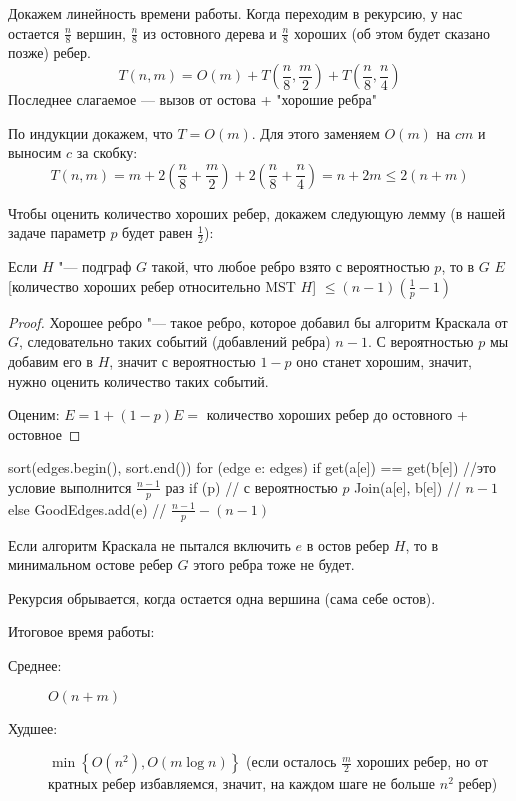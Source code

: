 Докажем линейность времени работы.
Когда переходим в рекурсию, у нас остается $\frac{n}{8}$ вершин, $\frac{n}{8}$ из остовного дерева
и $\frac{n}{8}$ хороших (об этом будет сказано позже) ребер.
\[ T(n, m) = O(m) + T\left(\frac{n}{8}, \frac{m}{2}\right) + T\left(\frac{n}{8}, \frac{n}{4}\right) \]
Последнее слагаемое — вызов от остова + "хорошие ребра"

По индукции докажем, что $T = O(m)$. Для этого заменяем $O(m)$ на $cm$ и выносим $c$ за скобку:
\[ T(n, m) = m + 2\left(\frac{n}{8} + \frac{m}{2}\right) + 2\left(\frac{n}{8} + \frac{n}{4}\right) = n + 2m \le 2(n + m) \]

Чтобы оценить количество хороших ребер, докажем следующую лемму (в нашей задаче параметр $p$ будет равен  $\frac{1}{2}$):

\begin{lemma}
	Если $H$ "--- подграф $G$ такой, что любое ребро взято с вероятностью $p$, то в $G$
	$E$[количество хороших ребер относительно 	{MST} $H$] $\le (n - 1)(\frac{1}{p} - 1)$
\end{lemma}
\begin{proof}
	Хорошее ребро "--- такое ребро, которое добавил бы алгоритм Краскала от $G$, следовательно таких событий (добавлений ребра) $n - 1$.
	С вероятностью $p$ мы добавим его в $H$, значит с вероятностью $1 - p$ оно станет хорошим, значит, нужно оценить количество таких событий.

Оценим: $E = 1 + (1 - p)E = $ количество хороших ребер до остовного + остовное
\end{proof}

\begin{cppcode}
sort(edges.begin(), sort.end())
for (edge e: edges) {
	if get(a[e]) == get(b[e]) //это условие выполнится $\frac{n - 1}{p}$ раз
		if (p) // с вероятностью $p$
			Join(a[e], b[e]) // $n - 1$
		else
			GoodEdges.add(e) // $\frac{n - 1}{p} - (n - 1)$
}
\end{cppcode}

\begin{Rem}
	Если алгоритм Краскала не пытался включить $e$ в остов ребер $H$, то в минимальном остове ребер $G$ этого ребра тоже не будет.
\end{Rem}
\begin{Rem}
	Рекурсия обрывается, когда остается одна вершина (сама себе остов).
\end{Rem}

Итоговое время работы:
\begin{description}
\item[Среднее:]
	$O(n + m)$

\item[Худшее:]
	$\min\left\{O\left(n^2\right), O(m \log n)\right\}$
	(если осталось $\frac{m}{2}$ хороших ребер, но от кратных ребер избавляемся, значит, на каждом шаге не больше $n^2$ ребер)
\end{description}

